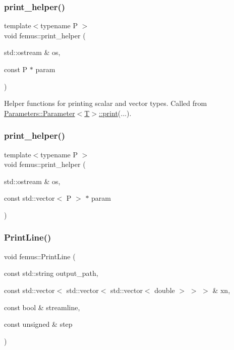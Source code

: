 \mbox{\label{namespacefemus_a9e14cd43ebee4a0f5e3fc2378239152a}} 
\subsubsection{\texorpdfstring{print\+\_\+helper()}{print\_helper()}\hspace{0.1cm}{\footnotesize\ttfamily [1/2]}}
{\footnotesize\ttfamily template$<$typename P $>$ \\
void femus\+::print\+\_\+helper (\begin{DoxyParamCaption}\item[{std\+::ostream \&}]{os,  }\item[{const P $\ast$}]{param }\end{DoxyParamCaption})}

Helper functions for printing scalar and vector types. Called from \mbox{\hyperlink{classfemus_1_1_parameters_1_1_parameter_aecc1e861889ad36033fd905c30e5b70c}{Parameters\+::\+Parameter$<$\+T$>$\+::print}}(...). \mbox{\label{namespacefemus_a673516e5f037c8f0dd0918b01a16edb1}} 
\subsubsection{\texorpdfstring{print\+\_\+helper()}{print\_helper()}\hspace{0.1cm}{\footnotesize\ttfamily [2/2]}}
{\footnotesize\ttfamily template$<$typename P $>$ \\
void femus\+::print\+\_\+helper (\begin{DoxyParamCaption}\item[{std\+::ostream \&}]{os,  }\item[{const std\+::vector$<$ P $>$ $\ast$}]{param }\end{DoxyParamCaption})}

\mbox{\label{namespacefemus_aac2a4afaac51207ff5b5ed649f6540c9}} 
\subsubsection{\texorpdfstring{Print\+Line()}{PrintLine()}}
{\footnotesize\ttfamily void femus\+::\+Print\+Line (\begin{DoxyParamCaption}\item[{const std\+::string}]{output\+\_\+path,  }\item[{const std\+::vector$<$ std\+::vector$<$ std\+::vector$<$ double $>$ $>$ $>$ \&}]{xn,  }\item[{const bool \&}]{streamline,  }\item[{const unsigned \&}]{step }\end{DoxyParamCaption})}

